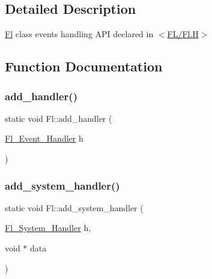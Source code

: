 \subsection{Detailed Description}
\hyperlink{class_fl}{Fl} class events handling A\+PI declared in $<$\hyperlink{_fl_8_h}{F\+L/\+Fl.\+H}$>$ 

\subsection{Function Documentation}
\mbox{\label{group__fl__events_ga04759d795ad0df6d5ee19e82aa92b3ec}} 
\subsubsection{\texorpdfstring{add\+\_\+handler()}{add\_handler()}}
{\footnotesize\ttfamily static void Fl\+::add\+\_\+handler (\begin{DoxyParamCaption}\item[{\hyperlink{group__callback__functions_ga188f6b1dd8e78ccc91c013fe5c6bba74}{Fl\+\_\+\+Event\+\_\+\+Handler}}]{h }\end{DoxyParamCaption})\hspace{0.3cm}{\ttfamily [static]}}

\mbox{\label{group__fl__events_ga49d612bb8375ea7b7447d7e483e771ff}} 
\subsubsection{\texorpdfstring{add\+\_\+system\+\_\+handler()}{add\_system\_handler()}}
{\footnotesize\ttfamily static void Fl\+::add\+\_\+system\+\_\+handler (\begin{DoxyParamCaption}\item[{\hyperlink{group__callback__functions_ga0cd86d9a18073304779213e82747ac8a}{Fl\+\_\+\+System\+\_\+\+Handler}}]{h,  }\item[{void $\ast$}]{data }\end{DoxyParamCaption})\hspace{0.3cm}{\ttfamily [static]}}

